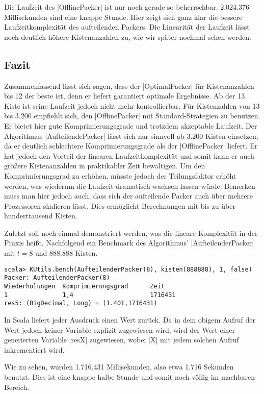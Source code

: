  Die Laufzeit des |OfflinePacker| ist nur noch gerade so beherrschbar. 2.024.376 Millisekunden sind eine knappe Stunde.
 Hier zeigt sich ganz klar die bessere Laufzeitkomplexität des aufteilenden Packers.
 Die Linearität der Laufzeit lässt noch deutlich höhere Kistenanzahlen zu, wie wir später nochmal sehen werden.

\clearpage
\subsection{Fazit}
Zusammenfassend lässt sich sagen, dass der |OptimalPacker| für Kistenanzahlen bis 12 der beste ist, denn er liefert garantiert optimale Ergebnisse.
Ab der 13. Kiste ist seine Laufzeit jedoch nicht mehr kontrollierbar.
Für Kistenzahlen von 13 bis 3.200 empfiehlt sich, den |OfflinePacker| mit Standard-Strategien zu benutzen.
Er bietet hier gute Komprimierungsgrade und trotzdem akzeptable Laufzeit.
Der Algorithmus |AufteilendePacker| lässt sich nur sinnvoll ab 3.200 Kisten einsetzen, da er deutlich schlechtere Komprimierungsgrade als der |OfflinePacker| liefert.
Er hat jedoch den Vorteil der linearen Laufzeitkomplexität und somit kann er auch größere Kistenanzahlen in praktikabler Zeit bewältigen.
Um den Komprimierungsgrad zu erhöhen, müsste jedoch der Teilungsfaktor erhöht werden, was wiederum die Laufzeit dramatisch wachsen lassen würde.
Bemerken muss man hier jedoch auch, dass sich der aufteilende Packer auch über mehrere Prozessoren skalieren lässt.
Dies ermöglicht Berechnungen mit bis zu über hunderttausend Kisten.

Zuletzt soll noch einmal demonstriert werden, was die lineare Komplexität in der Praxis heißt.
Nachfolgend ein Benchmark des Algorithmus' |AufteilenderPacker| mit $t=8$ und 888.888 Kisten.
\begin{lstlisting}
scala> KUtils.bench(AufteilenderPacker(8), kisten(888888), 1, false)
Packer: AufteilenderPacker(8)
Wiederholungen  Komprimierungsgrad      Zeit
1               1,4                     1716431
res5: (BigDecimal, Long) = (1.401,1716431)
\end{lstlisting}
In Scala liefert jeder Ausdruck einen Wert zurück. Da in dem obigem Aufruf der Wert jedoch keiner Variable explizit zugewiesen wird,
 wird der Wert einer generierten Variable |resX| zugewiesen, wobei |X| mit jedem solchen Aufruf inkrementiert wird.

Wie zu sehen, wurden 1.716.431 Millisekunden, also etwa 1.716 Sekunden benutzt. Dies ist eine knappe halbe Stunde und somit noch völlig im machbaren Bereich.
\clearpage
